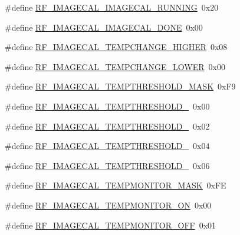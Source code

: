 \begin{DoxyCompactItemize}
\item 
\#define \mbox{\hyperlink{sx1276_regs-_fsk_8h_a491baca7615a667462dbb91548b46e53}{R\+F\+\_\+\+I\+M\+A\+G\+E\+C\+A\+L\+\_\+\+I\+M\+A\+G\+E\+C\+A\+L\+\_\+\+R\+U\+N\+N\+I\+NG}}~0x20
\item 
\#define \mbox{\hyperlink{sx1276_regs-_fsk_8h_af062b902b4557ff0de124bb91de0cbc7}{R\+F\+\_\+\+I\+M\+A\+G\+E\+C\+A\+L\+\_\+\+I\+M\+A\+G\+E\+C\+A\+L\+\_\+\+D\+O\+NE}}~0x00
\item 
\#define \mbox{\hyperlink{sx1276_regs-_fsk_8h_a03320f56cee8ba418004acafcdd34249}{R\+F\+\_\+\+I\+M\+A\+G\+E\+C\+A\+L\+\_\+\+T\+E\+M\+P\+C\+H\+A\+N\+G\+E\+\_\+\+H\+I\+G\+H\+ER}}~0x08
\item 
\#define \mbox{\hyperlink{sx1276_regs-_fsk_8h_a63c7e38c8fe42a56c9e21141c63ed6fd}{R\+F\+\_\+\+I\+M\+A\+G\+E\+C\+A\+L\+\_\+\+T\+E\+M\+P\+C\+H\+A\+N\+G\+E\+\_\+\+L\+O\+W\+ER}}~0x00
\item 
\#define \mbox{\hyperlink{sx1276_regs-_fsk_8h_a71e92b3a6cabbb3c991d406981b0ca4c}{R\+F\+\_\+\+I\+M\+A\+G\+E\+C\+A\+L\+\_\+\+T\+E\+M\+P\+T\+H\+R\+E\+S\+H\+O\+L\+D\+\_\+\+M\+A\+SK}}~0x\+F9
\item 
\#define \mbox{\hyperlink{sx1276_regs-_fsk_8h_a823732f79cd8fdb0e911e9845eefdfc7}{R\+F\+\_\+\+I\+M\+A\+G\+E\+C\+A\+L\+\_\+\+T\+E\+M\+P\+T\+H\+R\+E\+S\+H\+O\+L\+D\+\_}}~0x00
\item 
\#define \mbox{\hyperlink{sx1276_regs-_fsk_8h_ace08ac63033530d1b78d0902d0563095}{R\+F\+\_\+\+I\+M\+A\+G\+E\+C\+A\+L\+\_\+\+T\+E\+M\+P\+T\+H\+R\+E\+S\+H\+O\+L\+D\+\_}}~0x02
\item 
\#define \mbox{\hyperlink{sx1276_regs-_fsk_8h_ac99967aa7133c5de90e00d89cdb2fc31}{R\+F\+\_\+\+I\+M\+A\+G\+E\+C\+A\+L\+\_\+\+T\+E\+M\+P\+T\+H\+R\+E\+S\+H\+O\+L\+D\+\_}}~0x04
\item 
\#define \mbox{\hyperlink{sx1276_regs-_fsk_8h_a15e6175c8004a9070dc082987c16c8f5}{R\+F\+\_\+\+I\+M\+A\+G\+E\+C\+A\+L\+\_\+\+T\+E\+M\+P\+T\+H\+R\+E\+S\+H\+O\+L\+D\+\_}}~0x06
\item 
\#define \mbox{\hyperlink{sx1276_regs-_fsk_8h_ab383d53c5725baec9e3eca281bb1c8ab}{R\+F\+\_\+\+I\+M\+A\+G\+E\+C\+A\+L\+\_\+\+T\+E\+M\+P\+M\+O\+N\+I\+T\+O\+R\+\_\+\+M\+A\+SK}}~0x\+FE
\item 
\#define \mbox{\hyperlink{sx1276_regs-_fsk_8h_af81f91a2ef01cc97f6c0da04fa990513}{R\+F\+\_\+\+I\+M\+A\+G\+E\+C\+A\+L\+\_\+\+T\+E\+M\+P\+M\+O\+N\+I\+T\+O\+R\+\_\+\+ON}}~0x00
\item 
\#define \mbox{\hyperlink{sx1276_regs-_fsk_8h_a88d0a3e79e03d24bc1d0585bb495a8f6}{R\+F\+\_\+\+I\+M\+A\+G\+E\+C\+A\+L\+\_\+\+T\+E\+M\+P\+M\+O\+N\+I\+T\+O\+R\+\_\+\+O\+FF}}~0x01

\end{DoxyCompactItemize}
